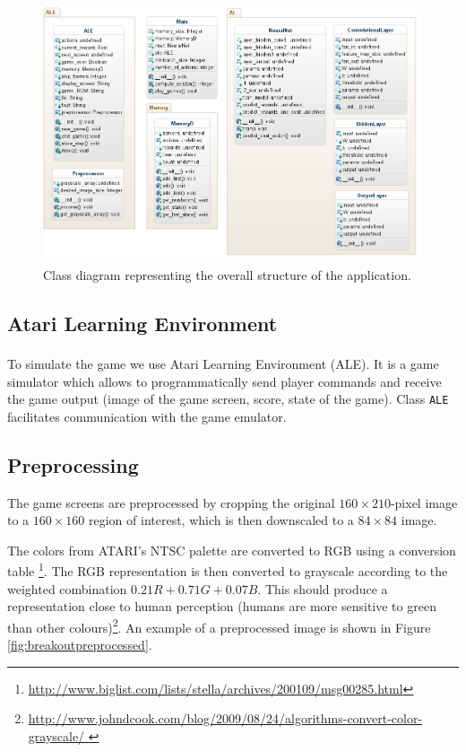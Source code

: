 \documentclass[a4paper,12pt]{article}
\begin{document}
\begin{figure}[h]
	\centering
	\includegraphics[width=\textwidth]{images/DeepMind-diag.png}
	\caption{Class diagram representing the overall structure of the application.}
	\label{fig:classdiagram}
\end{figure}


\subsection{Atari Learning Environment}
To simulate the game we use Atari Learning Environment (ALE)\textsuperscript{\cite{bellemare13arcade}}. It is a game simulator which allows to programmatically send player commands and receive the game output (image of the game screen, score, state of the game). Class \texttt{ALE} facilitates communication with the game emulator.


\subsection{Preprocessing}
\label{subsection_preproc}
The game screens are preprocessed by cropping the original $160 \times 210$-pixel image to a $160 \times 160$ region of interest, which is then downscaled to a $84 \times 84$ image.

The colors from ATARI's NTSC palette are converted to RGB using a conversion table
\footnote{\url{http://www.biglist.com/lists/stella/archives/200109/msg00285.html}}. The RGB representation is then converted to grayscale according to the weighted combination $0.21R + 0.71G + 0.07B$. This should produce a representation close to human perception (humans are more sensitive to green than other colours)\footnote{\url{http://www.johndcook.com/blog/2009/08/24/algorithms-convert-color-grayscale/
}}. An example of a preprocessed image is shown in Figure \ref{fig:breakoutpreprocessed}.
\end{document}
